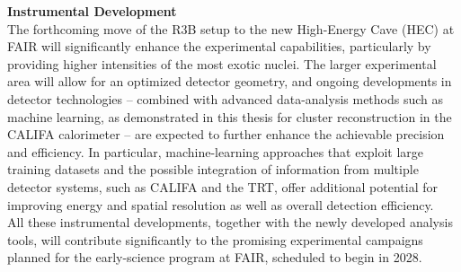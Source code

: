 \textbf{Instrumental Development}\\
The forthcoming move of the R3B setup to the new High-Energy Cave (HEC) at FAIR will significantly enhance the experimental capabilities, particularly by providing higher intensities of the most exotic nuclei. The larger experimental area will allow for an optimized detector geometry, and ongoing developments in detector technologies -- combined with advanced data-analysis methods such as machine learning, as demonstrated in this thesis for cluster reconstruction in the CALIFA calorimeter -- are expected to further enhance the achievable precision and efficiency. In particular, machine-learning approaches that exploit large training datasets and the possible integration of information from multiple detector systems, such as CALIFA and the TRT, offer additional potential for improving energy and spatial resolution as well as overall detection efficiency.\\
All these instrumental developments, together with the newly developed analysis tools, will contribute significantly to the promising experimental campaigns planned for the early-science program at FAIR, scheduled to begin in 2028.
